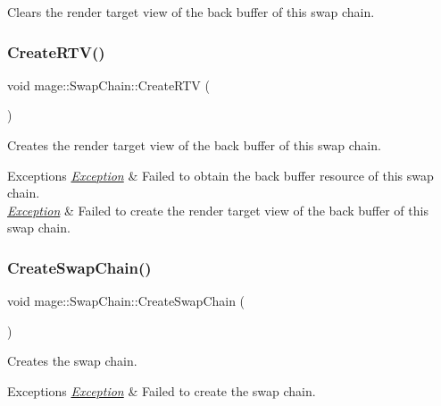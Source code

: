 Clears the render target view of the back buffer of this swap chain. \hypertarget{classmage_1_1_swap_chain_a9cdb798d8911e2f1239ad7eb79cc6b87}{}\label{classmage_1_1_swap_chain_a9cdb798d8911e2f1239ad7eb79cc6b87} 
\subsubsection{\texorpdfstring{Create\+R\+T\+V()}{CreateRTV()}}
{\footnotesize\ttfamily void mage\+::\+Swap\+Chain\+::\+Create\+R\+TV (\begin{DoxyParamCaption}{ }\end{DoxyParamCaption})\hspace{0.3cm}{\ttfamily [private]}}

Creates the render target view of the back buffer of this swap chain.


\begin{DoxyExceptions}{Exceptions}
{\em \hyperlink{classmage_1_1_exception}{Exception}} & Failed to obtain the back buffer resource of this swap chain. \\
\hline
{\em \hyperlink{classmage_1_1_exception}{Exception}} & Failed to create the render target view of the back buffer of this swap chain. \\
\hline
\end{DoxyExceptions}
\hypertarget{classmage_1_1_swap_chain_a9474cae31868f020c76439febc6e1afd}{}\label{classmage_1_1_swap_chain_a9474cae31868f020c76439febc6e1afd} 
\subsubsection{\texorpdfstring{Create\+Swap\+Chain()}{CreateSwapChain()}}
{\footnotesize\ttfamily void mage\+::\+Swap\+Chain\+::\+Create\+Swap\+Chain (\begin{DoxyParamCaption}{ }\end{DoxyParamCaption})\hspace{0.3cm}{\ttfamily [private]}}

Creates the swap chain.


\begin{DoxyExceptions}{Exceptions}
{\em \hyperlink{classmage_1_1_exception}{Exception}} & Failed to create the swap chain. \\
\hline
\end{DoxyExceptions}
\hypertarget{classmage_1_1_swap_chain_a9ed25cd34dedc97e25e26e58456ac2fe}{}\label{classmage_1_1_swap_chain_a9ed25cd34dedc97e25e26e58456ac2fe} 

